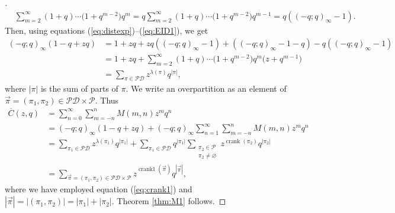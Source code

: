 \documentclass[10pt,a4paper]{amsart}
\numberwithin{equation}{section}
\newcommand\mylabel[1]{\label{#1}}
\newcommand\thm[1]{\ref{thm:#1}}
\newcommand\eqn[1]{(\ref{eq:#1})}
\begin{document}
\begin{proof}[\unskip\nopunct]
\begin{align}
\mylabel{eq:EID1}
&\sum\limits_{m=2}^{\infty}(1+q)\cdots\bigl(1+q^{m-2}\bigr)q^m=q\sum\limits_{m=2}^{\infty}(1+q)\cdots\bigl(1+q^{m-2}\bigr)q^{m-1}=q((-q;q)_{\infty}-1).
\end{align}
Then, using equations \eqn{distexp}--\eqn{EID1}, we get
\begin{align*}
(-q;q)_{\infty}(1-q+zq)&{}=1+zq+zq ((-q;q)_{\infty}-1)+((-q;q)_{\infty}-1-q)-q((-q;q)_{\infty}-1)
\\
&{}=1+zq+\sum\limits_{m=2}^{\infty}(1+q)\cdots\bigl(1+q^{m-2}\bigr)q^m\bigl(z+q^{m-1}\bigr)
\\
&{}=\sum\limits_{\pi \in \mathcal{PD}}z^{\lambda(\pi)}q^{|\pi|},
\end{align*}
where $|\pi|$ is the sum of parts of $\pi$. We write an overpartition as an element of $\vec{\pi}=(\pi_1,\pi_2) \in \mathcal{PD} \times \mathcal{P}$. Thus
\begin{align*}
\overline{C}(z,q)&{}=\sum_{n=0}^\infty \sum_{m=-n}^n M(m,n) z^m q^n
\\
&{}=(-q;q)_{\infty}(1-q+zq)+(-q;q)_{\infty}\sum_{n=1}^\infty
\sum_{m=-n}^n M(m,n) z^m q^n
\\
&{}=\sum\limits_{\pi_1 \in \mathcal{PD}}z^{\lambda(\pi_1)}q^{|\pi_1|}+\sum\limits_{\pi_1 \in \mathcal{PD}}q^{|\pi_1|}\sum\limits_{\substack{\pi_2 \in \mathcal{P}\\ \pi_2 \neq \varnothing}}z^{\operatorname{crank}(\pi_2)}q^{|\pi_2|}
\\
&{}=\sum\limits_{\vec{\pi} = (\pi_1,\pi_2) \in \mathcal{PD}\times \mathcal{P}}z^{\operatorname{crank1}(\vec{\pi})}q^{|\vec{\pi}|},
\end{align*}
where we have employed equation \eqn{crank1} and $|\vec{\pi}|=|(\pi_1,\pi_2)|=|\pi_1|+|\pi_2|.$ Theorem \thm{M1} follows.
\end{proof}
\end{document}
